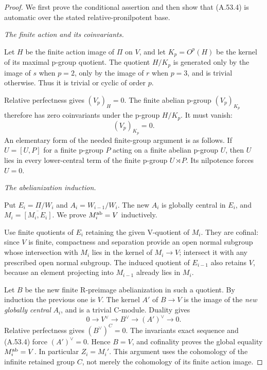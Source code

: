 \begin{proof}
We first prove the conditional assertion and
then show that (A.53.4) is automatic over the
stated relative-pronilpotent base.

\emph{The finite action and its coinvariants.}\par
Let \(H\) be the finite action image of \(\Pi\)
on \(V\), and let
\(K_p=O^p(H)\) be the kernel of its maximal
p-group quotient. The quotient \(H/K_p\)
is generated only by the image of \(s\) when
\(p=2\), only by the image of \(r\) when
\(p=3\), and is trivial otherwise. Thus it is
trivial or cyclic of order \(p\).

Relative perfectness gives \((V_p)_H=0\).
The finite abelian p-group \((V_p)_{K_p}\)
therefore has zero coinvariants under the
p-group \(H/K_p\). It must vanish:
\[
                           (V_p)_{K_p}=0.
                                                               \tag{A.53.6}
\]
An elementary form of the needed finite-group
argument is as follows. If \(U=[U,P]\) for
a finite p-group \(P\) acting on a finite
abelian p-group \(U\), then \(U\) lies in
every lower-central term of the finite p-group
\(U\rtimes P\). Its nilpotence forces \(U=0\).

\emph{The abelianization induction.}\par
Put \(E_i=\Pi/W_i\) and
\(A_i=W_{i-1}/W_i\). The new \(A_i\) is
globally central in \(E_i\), and
\(M_i=\overline{[M_i,E_i]}\). We prove
\(M_i^{\rm ab}=V\) inductively.

Use finite quotients of \(E_i\) retaining the
given V-quotient of \(M_i\). They are cofinal:
since \(V\) is finite, compactness and
separation provide an open normal subgroup
whose intersection with \(M_i\) lies in the
kernel of \(M_i\to V\); intersect it with
any prescribed open normal subgroup.
The induced quotient of \(E_{i-1}\) also
retains \(V\), because an element projecting
into \(M_{i-1}\) already lies in \(M_i\).

Let \(B\) be the new finite R-preimage
abelianization in such a quotient. By induction
the previous one is \(V\). The kernel \(A'\)
of \(B\to V\) is the image of the
\emph{new globally central} \(A_i\), and is
a trivial C-module. Duality gives
\[
 0\longrightarrow V^\vee\longrightarrow B^\vee
   \longrightarrow (A')^\vee\longrightarrow0.
                                                               \tag{A.53.7}
\]
Relative perfectness gives
\((B^\vee)^C=0\). The invariants exact sequence
and (A.53.4) force \((A')^\vee=0\).
Hence \(B=V\), and cofinality proves the
global equality \(M_i^{\rm ab}=V\).
In particular \(Z_i=M_i'\).
This argument uses the cohomology of the
infinite retained group \(C\), not merely
the cohomology of its finite action image.


\end{proof}
